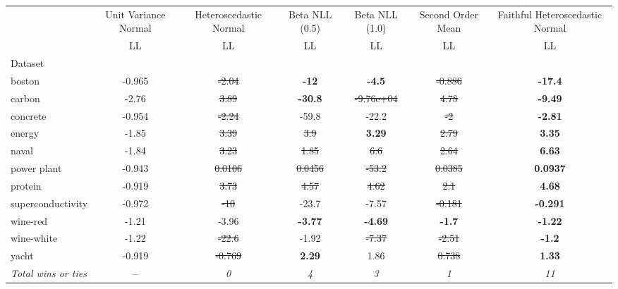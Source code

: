 \begin{tabular}{l|c|c|c|c|c|c}
\toprule
{} & {Unit Variance Normal} & {Heteroscedastic Normal} & {Beta NLL (0.5)} & {Beta NLL (1.0)} & {Second Order Mean} & {Faithful Heteroscedastic Normal} \\
{} & {LL} & {LL} & {LL} & {LL} & {LL} & {LL} \\
{Dataset} & {} & {} & {} & {} & {} & {} \\
\midrule
boston & -0.965 & \sout{-2.04} & \textbf{-12} & \textbf{-4.5} & \sout{-0.886} & \textbf{-17.4} \\
carbon & -2.76 & \sout{3.89} & \textbf{-30.8} & \sout{-9.76e+04} & \sout{4.78} & \textbf{-9.49} \\
concrete & -0.954 & \sout{-2.24} & -59.8 & -22.2 & \sout{-2} & \textbf{-2.81} \\
energy & -1.85 & \sout{3.39} & \sout{3.9} & \textbf{3.29} & \sout{2.79} & \textbf{3.35} \\
naval & -1.84 & \sout{3.23} & \sout{1.85} & \sout{6.6} & \sout{2.64} & \textbf{6.63} \\
power plant & -0.943 & \sout{0.0106} & \sout{0.0456} & \sout{-53.2} & \sout{0.0385} & \textbf{0.0937} \\
protein & -0.919 & \sout{3.73} & \sout{4.57} & \sout{4.62} & \sout{2.1} & \textbf{4.68} \\
superconductivity & -0.972 & \sout{-10} & -23.7 & -7.57 & \sout{-0.181} & \textbf{-0.291} \\
wine-red & -1.21 & -3.96 & \textbf{-3.77} & \textbf{-4.69} & \textbf{-1.7} & \textbf{-1.22} \\
wine-white & -1.22 & \sout{-22.6} & -1.92 & \sout{-7.37} & \sout{-2.51} & \textbf{-1.2} \\
yacht & -0.919 & \sout{-0.769} & \textbf{2.29} & 1.86 & \sout{0.738} & \textbf{1.33} \\
\textit{{Total wins or ties}} & -- & \textit{0} & \textit{4} & \textit{3} & \textit{1} & \textit{11} \\
\bottomrule
\end{tabular}
